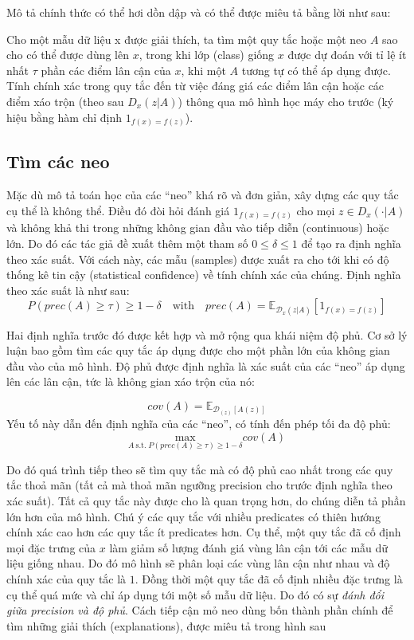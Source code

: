 Mô tả chính thức có thể hơi dồn dập và có thể được miêu tả bằng lời như sau:

Cho một mẫu dữ liệu x được giải thích, ta tìm một quy tắc hoặc một neo $A$ sao cho có thể được dùng lên $x$, trong khi lớp (class) giống $x$ được dự đoán với tỉ lệ ít nhất $\tau$ phần các điểm lân cận của $x$, khi một $A$ tương tự có thể áp dụng được. Tính chính xác trong quy tắc đến từ việc đáng giá các điểm lân cận hoặc các điểm xáo trộn (theo sau $D_x(z | A)$) thông qua mô hình học máy cho trước (ký hiệu bằng hàm chỉ định $1_{f(x) = f(z)}$).

\subsection{Tìm các neo}

Mặc dù mô tả toán học của các “neo” khá rõ và đơn giản, xây dựng các quy tắc cụ thể là không thể. Điều đó đòi hỏi đánh giá $1_{f(x) = f(z)}$ cho mọi $z \in D_x(\cdot | A)$  và không khả thi trong những không gian đầu vào tiếp diễn (continuous) hoặc lớn. Do đó các tác giả đề xuất thêm một tham số $0 \leq \delta \leq 1$ để tạo ra định nghĩa theo xác suất. Với cách này, các mẫu (samples) được xuất ra cho tới khi có độ thống kê tin cậy (statistical confidence) về tính chính xác của chúng. Định nghĩa theo xác suất là như sau:
$$P(prec(A)\geq\tau)\geq{}1-\delta\quad\textrm{with}\quad{}prec(A)=\mathbb{E}_{\mathcal{D}_x(z|A)}[1_{f(x)=f(z)}]$$

Hai định nghĩa trước đó được kết hợp và mở rộng qua khái niệm độ phủ. Cơ sở lý luận bao gồm tìm các quy tắc áp dụng được cho một phần lớn của không gian đầu vào của mô hình. Độ phủ được định nghĩa là xác suất của các “neo” áp dụng lên các lân cận, tức là không gian xáo trộn của nó:

$$cov(A)=\mathbb{E}_{\mathcal{D}_{(z)}[A(z)]}$$
Yếu tố này dẫn đến định nghĩa của các “neo”, có tính đến phép tối đa độ phủ:
$$\underset{A\:\textrm{s.t.}\;P(prec(A)\geq\tau)\geq{}1-\delta}{\textrm{max}}cov(A)$$

Do đó quá trình tiếp theo sẽ tìm quy tắc mà có độ phủ cao nhất trong các quy tắc thoả mãn (tất cả mà thoả mãn ngưỡng precision cho trước định nghĩa theo xác suất). Tất cả quy tắc này được cho là quan trọng hơn, do chúng diễn tả phần lớn hơn của mô hình. Chú ý các quy tắc với nhiều predicates có thiên hướng chính xác cao hơn các quy tắc ít predicates hơn. Cụ thể, một quy tắc đã cố định mọi đặc trưng của $x$ làm giảm số lượng đánh giá vùng lân cận tới các mẫu dữ liệu giống nhau. Do đó mô hình sẽ phân loại các vùng lân cận như nhau và độ chính xác của quy tắc là $1.$ Đồng thời một quy tắc đã cố định nhiều đặc trưng là cụ thể quá mức và chỉ áp dụng tới một số mẫu dữ liệu. Do đó có sự \textit{đánh đổi giữa precision và độ phủ}. Cách tiếp cận mỏ neo dùng bốn thành phần chính để tìm những giải thích (explanations), được miêu tả trong hình sau 
